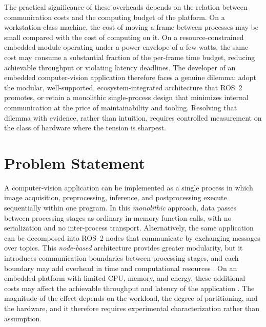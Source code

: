 The practical significance of these overheads depends on the relation
between communication costs and the computing budget of the platform. On a
workstation-class machine, the cost of moving a frame between processes
may be small compared with the cost of computing on it. On a
resource-constrained embedded module operating under a power envelope of a
few watts, the same cost may consume a substantial fraction of the
per-frame time budget, reducing achievable throughput or violating
latency deadlines. The developer of an embedded computer-vision
application therefore faces a genuine dilemma: adopt the modular,
well-supported, ecosystem-integrated architecture that ROS~2 promotes, or
retain a monolithic single-process design that minimizes internal
communication at the price of maintainability and tooling. Resolving that
dilemma with evidence, rather than intuition, requires controlled
measurement on the class of hardware where the tension is sharpest.

\section{Problem Statement}
\label{sec:problem-statement}

A computer-vision application can be implemented as a single process in
which image acquisition, preprocessing, inference, and postprocessing
execute sequentially within one program. In this \emph{monolithic}
approach, data passes between processing stages as ordinary in-memory
function calls, with no serialization and no inter-process transport.
Alternatively, the same application can be decomposed into ROS~2 nodes
that communicate by exchanging messages over topics. This
\emph{node-based} architecture provides greater modularity, but it
introduces communication boundaries between processing stages, and each
boundary may add overhead in time and computational resources
\cite{maruyama2016, kronauer2021, kamiya2025, luo2025}. On an embedded
platform with limited CPU, memory, and energy, these additional costs may
affect the achievable throughput and latency of the application
\cite{kronauer2021, macenski2023}. The magnitude of the effect depends on
the workload, the degree of partitioning, and the hardware, and it
therefore requires experimental characterization rather than assumption.

